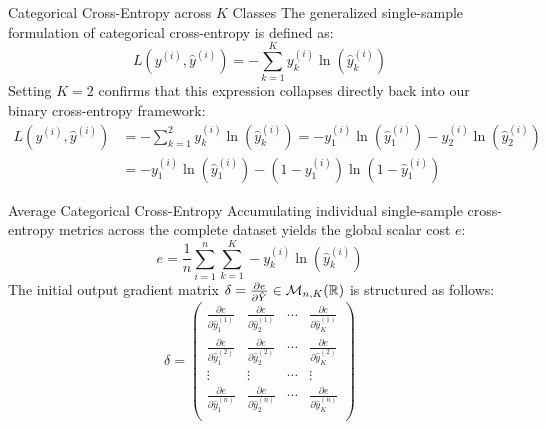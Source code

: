 \begin{frame}{Categorical Cross-Entropy across $K$ Classes}
	The generalized single-sample formulation of categorical cross-entropy is defined as:
	\begin{equation*}
		L\left(y^{(i)}, \hat{y}^{(i)}\right) = -\sum_{k=1}^K y_k^{(i)} \ln{\left(\hat{y}_k^{(i)}\right)}
	\end{equation*}
	\pause
	Setting $K = 2$ confirms that this expression collapses directly back into our binary cross-entropy framework:
	\begin{equation*}
		\begin{aligned}
			L\left(y^{(i)}, \hat{y}^{(i)}\right) 
			&= -\sum_{k=1}^2 y_k^{(i)} \ln{\left(\hat{y}_k^{(i)}\right)}
			= - y_{1}^{(i)} \ln{\left(\hat{y}_{1}^{(i)}\right)} - y_{2}^{(i)} \ln{\left(\hat{y}_{2}^{(i)}\right)} \\
			&= - y_{1}^{(i)} \ln{\left(\hat{y}_{1}^{(i)}\right)} - \left(1 - y_{1}^{(i)}\right) \ln{\left(1 - \hat{y}_{1}^{(i)}\right)}
		\end{aligned}
	\end{equation*}
\end{frame}

\begin{frame}{Average Categorical Cross-Entropy}
	Accumulating individual single-sample cross-entropy metrics across the complete dataset yields the global scalar cost $e$:
	\begin{equation*}
		e = \frac{1}{n} \sum_{i=1}^n \sum_{k=1}^K - y_k^{(i)} \ln{\left(\hat{y}_k^{(i)}\right)}
	\end{equation*}
	\pause
	The initial output gradient matrix $\delta = \frac{\partial{e}}{\partial{\hat{Y}}} \in \mathcal{M}_{n,K}(\mathbb{R})$ is structured as follows:
	\begin{equation*}
		\delta 
		= 
		\begin{pmatrix}
			\frac{\partial{e}}{\partial{\hat{y}_1^{(1)}}} & \frac{\partial{e}}{\partial{\hat{y}_2^{(1)}}} & \cdots & \frac{\partial{e}}{\partial{\hat{y}_K^{(1)}}} \\[5pt]
			\frac{\partial{e}}{\partial{\hat{y}_1^{(2)}}} & \frac{\partial{e}}{\partial{\hat{y}_2^{(2)}}} & \cdots & \frac{\partial{e}}{\partial{\hat{y}_K^{(2)}}}\\[5pt]
			\vdots & \vdots & \cdots & \vdots \\
			\frac{\partial{e}}{\partial{\hat{y}_1^{(n)}}} & \frac{\partial{e}}{\partial{\hat{y}_2^{(n)}}} & \cdots & 
			\frac{\partial{e}}{\partial{\hat{y}_K^{(n)}}}\\[5pt]
		\end{pmatrix}
	\end{equation*}
\end{frame}

